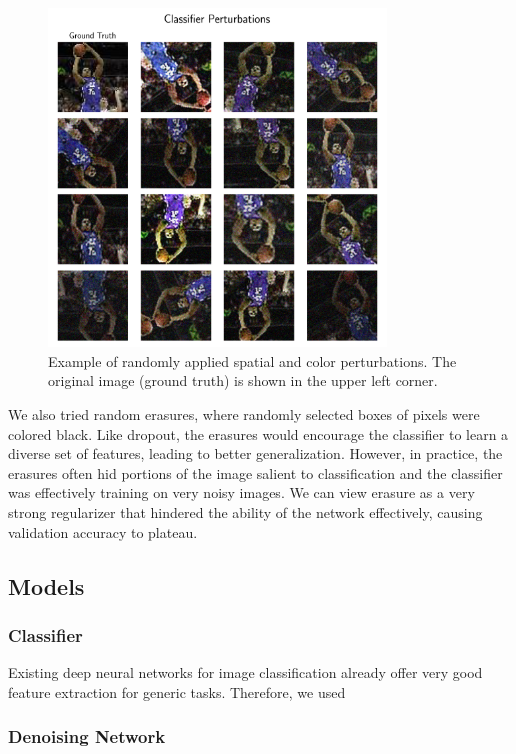 \documentclass[justified]{article}
\begin{document}
  \begin{figure}[H]
    \centering
    \includegraphics[width=0.8\textwidth]{figures/perturb.png}
    \caption{
      Example of randomly applied spatial and color perturbations.
      The original image (ground truth) is shown in the upper left corner.
    }
  \end{figure}

  We also tried random erasures, where randomly selected boxes of pixels were colored black.
  Like dropout, the erasures would encourage the classifier to learn a diverse set of features, leading to better generalization.
  However, in practice, the erasures often hid portions of the image salient to classification and the classifier was effectively training on very noisy images.
  We can view erasure as a very strong regularizer that hindered the ability of the network effectively, causing validation accuracy to plateau.

  \subsection{Models}

  \subsubsection{Classifier}

  Existing deep neural networks for image classification already offer very good feature extraction for generic tasks.
  Therefore, we used

  \subsubsection{Denoising Network}
\end{document}
